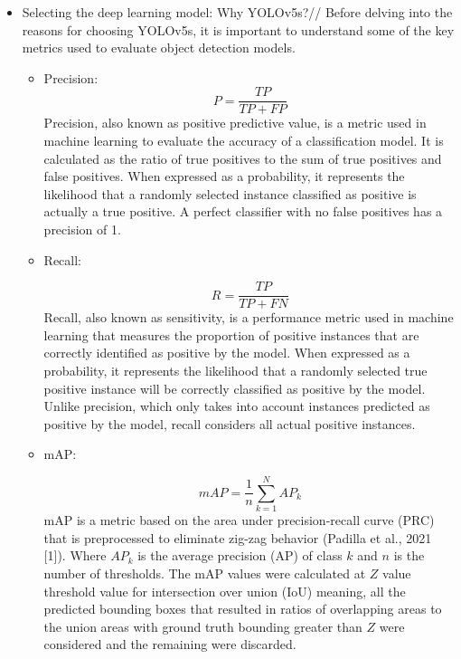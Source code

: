 \begin{itemize}
\item{Selecting the deep learning model: Why YOLOv5s?}//
Before delving into the reasons for choosing YOLOv5s, it is important to understand some of the key metrics used to evaluate object detection models. 
\begin{itemize}
\item Precision:
\begin{equation}
P = \frac{TP}{TP+FP}
\end{equation}
Precision, also known as positive predictive value, is a metric used in machine learning to evaluate the accuracy of a classification model. It is calculated as the ratio of true positives to the sum of true positives and false positives. When expressed as a probability, it represents the likelihood that a randomly selected instance classified as positive is actually a true positive. A perfect classifier with no false positives has a precision of 1.\cite{KGMM21}

\item Recall:

\begin{equation}
R = \frac{TP}{TP+FN}
\end{equation}
Recall, also known as sensitivity, is a performance metric used in machine learning that measures the proportion of positive instances that are correctly identified as positive by the model. When expressed as a probability, it represents the likelihood that a randomly selected true positive instance will be correctly classified as positive by the model. Unlike precision, which only takes into account instances predicted as positive by the model, recall considers all actual positive instances.\cite{KGMM21}

\item mAP:

\begin{equation}
mAP = \frac{1}{n} \sum_{k=1}^{N} AP_k
\end{equation}
mAP is a metric based on the area under precision-recall curve (PRC) that is preprocessed to eliminate zig-zag behavior (Padilla et al., 2021 [1]). Where $AP_k$ is the average precision (AP) of class $k$ and $n$ is the number of thresholds. The mAP values were calculated at $Z$ value threshold value for intersection over union (IoU) meaning, all the predicted bounding boxes that resulted in ratios of overlapping areas to the union areas with ground truth bounding greater than $Z$ were considered and the remaining were discarded.\cite{MG21}


\end{itemize}
\end{itemize}
